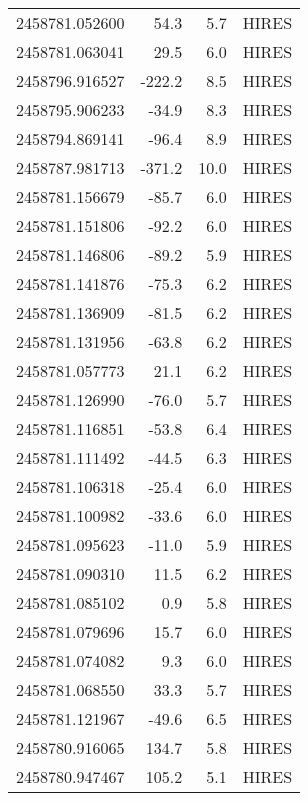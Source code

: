 \begin{tabular}{rrrl}
2458781.052600 &     54.3 &            5.7 &      HIRES \\
2458781.063041 &     29.5 &            6.0 &      HIRES \\
2458796.916527 &   -222.2 &            8.5 &      HIRES \\
2458795.906233 &    -34.9 &            8.3 &      HIRES \\
2458794.869141 &    -96.4 &            8.9 &      HIRES \\
2458787.981713 &   -371.2 &           10.0 &      HIRES \\
2458781.156679 &    -85.7 &            6.0 &      HIRES \\
2458781.151806 &    -92.2 &            6.0 &      HIRES \\
2458781.146806 &    -89.2 &            5.9 &      HIRES \\
2458781.141876 &    -75.3 &            6.2 &      HIRES \\
2458781.136909 &    -81.5 &            6.2 &      HIRES \\
2458781.131956 &    -63.8 &            6.2 &      HIRES \\
2458781.057773 &     21.1 &            6.2 &      HIRES \\
2458781.126990 &    -76.0 &            5.7 &      HIRES \\
2458781.116851 &    -53.8 &            6.4 &      HIRES \\
2458781.111492 &    -44.5 &            6.3 &      HIRES \\
2458781.106318 &    -25.4 &            6.0 &      HIRES \\
2458781.100982 &    -33.6 &            6.0 &      HIRES \\
2458781.095623 &    -11.0 &            5.9 &      HIRES \\
2458781.090310 &     11.5 &            6.2 &      HIRES \\
2458781.085102 &      0.9 &            5.8 &      HIRES \\
2458781.079696 &     15.7 &            6.0 &      HIRES \\
2458781.074082 &      9.3 &            6.0 &      HIRES \\
2458781.068550 &     33.3 &            5.7 &      HIRES \\
2458781.121967 &    -49.6 &            6.5 &      HIRES \\
2458780.916065 &    134.7 &            5.8 &      HIRES \\
2458780.947467 &    105.2 &            5.1 &      HIRES \\

\end{tabular}
